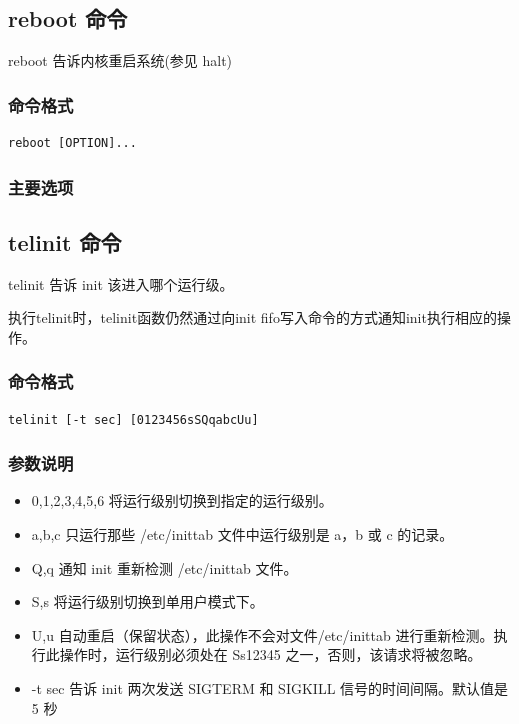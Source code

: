 \subsection{reboot 命令}

reboot 告诉内核重启系统(参见 halt)

\subsubsection{命令格式}

{\begin{shaded}\begin{verbatim}
reboot [OPTION]...
\end{verbatim}\end{shaded}}
\subsubsection{主要选项}

\subsection{telinit 命令}

telinit 告诉 init 该进入哪个运行级。

执行telinit时，telinit函数仍然通过向init
fifo写入命令的方式通知init执行相应的操作。

\subsubsection{命令格式}

{\begin{shaded}\begin{verbatim}
telinit [-t sec] [0123456sSQqabcUu]
\end{verbatim}\end{shaded}}
\subsubsection{参数说明}

\begin{itemize}
\item
  0,1,2,3,4,5,6 将运行级别切换到指定的运行级别。
\item
  a,b,c 只运行那些 /etc/inittab 文件中运行级别是 a，b 或 c 的记录。
\item
  Q,q 通知 init 重新检测 /etc/inittab 文件。
\item
  S,s 将运行级别切换到单用户模式下。
\item
  U,u 自动重启（保留状态），此操作不会对文件/etc/inittab
  进行重新检测。执行此操作时，运行级别必须处在 Ss12345
  之一，否则，该请求将被忽略。
\item
  -t sec 告诉 init 两次发送 SIGTERM 和 SIGKILL 信号的时间间隔。默认值是
  5 秒
\end{itemize}
